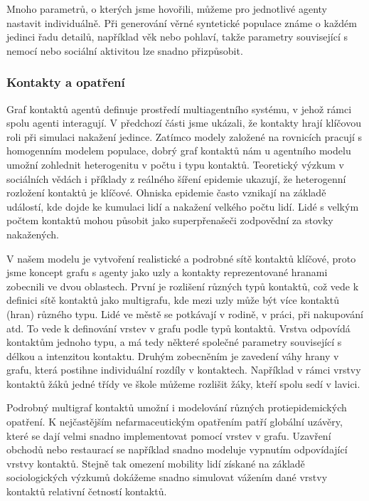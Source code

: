Mnoho parametrů, o kterých jsme hovořili, můžeme pro jednotlivé agenty nastavit individuálně. Při generování věrné syntetické populace známe o každém jedinci řadu detailů, například věk nebo pohlaví, takže parametry související s nemocí nebo sociální aktivitou lze snadno přizpůsobit. 




\subsubsection*{Kontakty a opatření}

Graf kontaktů agentů definuje prostředí multiagentního systému, v jehož rámci spolu agenti interagují. V předchozí části jsme ukázali, že kontakty hrají klíčovou roli při simulaci nakažení jedince. Zatímco modely založené na rovnicích pracují s homogenním modelem populace, dobrý graf kontaktů nám u agentního modelu umožní zohlednit heterogenitu v počtu i typu kontaktů. Teoretický výzkum v sociálních vědách i příklady z reálného šíření epidemie ukazují, že heterogenní rozložení kontaktů je klíčové. Ohniska epidemie často vznikají na základě událostí, kde dojde ke kumulaci lidí a nakažení velkého počtu lidí. Lidé s velkým počtem kontaktů mohou působit jako superpřenašeči zodpovědní za stovky nakažených.  

V našem modelu je vytvoření realistické a podrobné sítě kontaktů klíčové, proto jsme koncept grafu s agenty jako uzly a kontakty reprezentované hranami zobecnili ve dvou oblastech. První je rozlišení různých typů kontaktů, což vede k definici sítě kontaktů jako multigrafu, kde mezi uzly může být více kontaktů (hran) různého typu. Lidé ve městě se potkávají v rodině, v práci, při nakupování atd. To vede k definování vrstev v grafu podle typů kontaktů. Vrstva odpovídá kontaktům jednoho typu, a má tedy některé společné parametry související s délkou a intenzitou kontaktu. Druhým zobecněním je zavedení váhy hrany v grafu, která postihne individuální rozdíly v kontaktech. Například v rámci vrstvy kontaktů žáků jedné třídy ve škole můžeme rozlišit žáky, kteří spolu sedí v lavici. 

Podrobný multigraf kontaktů umožní i modelování různých protiepidemických opatření. K nejčastějším nefarmaceutickým opatřením patří globální uzávěry, které se dají velmi snadno implementovat pomocí vrstev v grafu. Uzavření obchodů nebo restaurací se například snadno modeluje vypnutím odpovídající vrstvy kontaktů. Stejně tak omezení mobility lidí získané na základě sociologických výzkumů dokážeme snadno simulovat vážením dané vrstvy kontaktů relativní četností kontaktů.

